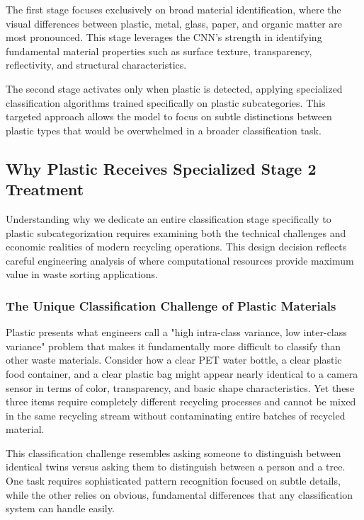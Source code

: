 \documentclass[11pt, a4paper]{article}
\begin{document}
The first stage focuses exclusively on broad material identification, where the visual differences between plastic, metal, glass, paper, and organic matter are most pronounced. This stage leverages the CNN's strength in identifying fundamental material properties such as surface texture, transparency, reflectivity, and structural characteristics.

The second stage activates only when plastic is detected, applying specialized classification algorithms trained specifically on plastic subcategories. This targeted approach allows the model to focus on subtle distinctions between plastic types that would be overwhelmed in a broader classification task.

\subsection{Why Plastic Receives Specialized Stage 2 Treatment}

Understanding why we dedicate an entire classification stage specifically to plastic subcategorization requires examining both the technical challenges and economic realities of modern recycling operations. This design decision reflects careful engineering analysis of where computational resources provide maximum value in waste sorting applications.

\subsubsection{The Unique Classification Challenge of Plastic Materials}

Plastic presents what engineers call a "high intra-class variance, low inter-class variance" problem that makes it fundamentally more difficult to classify than other waste materials. Consider how a clear PET water bottle, a clear plastic food container, and a clear plastic bag might appear nearly identical to a camera sensor in terms of color, transparency, and basic shape characteristics. Yet these three items require completely different recycling processes and cannot be mixed in the same recycling stream without contaminating entire batches of recycled material.

This classification challenge resembles asking someone to distinguish between identical twins versus asking them to distinguish between a person and a tree. One task requires sophisticated pattern recognition focused on subtle details, while the other relies on obvious, fundamental differences that any classification system can handle easily.
\end{document}
